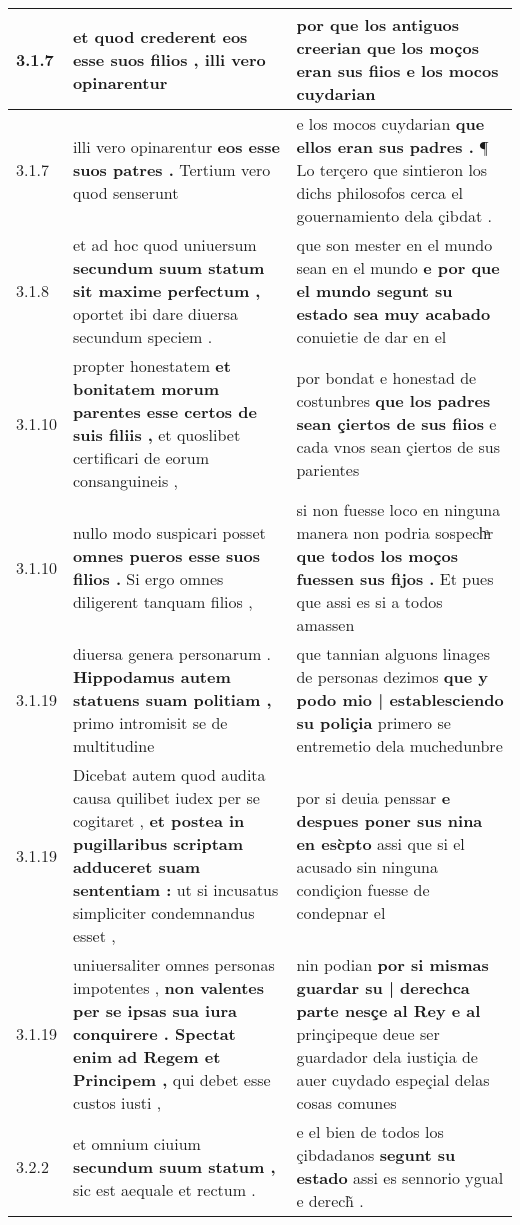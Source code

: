 \begin{tabular}{|p{1cm}|p{6.5cm}|p{6.5cm}|}
3.1.7 & et quod crederent \textbf{ eos esse suos filios , } illi vero opinarentur & por que los antiguos creerian \textbf{ que los moços eran sus fiios } e los mocos cuydarian \\\hline
3.1.7 & illi vero opinarentur \textbf{ eos esse suos patres . } Tertium vero quod senserunt & e los mocos cuydarian \textbf{ que ellos eran sus padres . } ¶ Lo terçero que sintieron los dichs philosofos cerca el gouernamiento dela çibdat . \\\hline
3.1.8 & et ad hoc quod uniuersum \textbf{ secundum suum statum sit maxime perfectum , } oportet ibi dare diuersa secundum speciem . & que son mester en el mundo sean en el mundo \textbf{ e por que el mundo segunt su estado sea muy acabado } conuietie de dar en el \\\hline
3.1.10 & propter honestatem \textbf{ et bonitatem morum parentes esse certos de suis filiis , } et quoslibet certificari de eorum consanguineis , & por bondat e honestad de costunbres \textbf{ que los padres sean çiertos de sus fiios } e cada vnos sean çiertos de sus parientes \\\hline
3.1.10 & nullo modo suspicari posset \textbf{ omnes pueros esse suos filios . } Si ergo omnes diligerent tanquam filios , & si non fuesse loco en ninguna manera non podria sospechͣr \textbf{ que todos los moços fuessen sus fijos . } Et pues que assi es si a todos amassen \\\hline
3.1.19 & diuersa genera personarum . \textbf{ Hippodamus autem statuens suam politiam , } primo intromisit se de multitudine & que tannian alguons linages de personas dezimos \textbf{ que y podo mio | establesciendo su poliçia } primero se entremetio dela muchedunbre \\\hline
3.1.19 & Dicebat autem quod audita causa quilibet iudex per se cogitaret , \textbf{ et postea in pugillaribus scriptam adduceret suam sententiam : } ut si incusatus simpliciter condemnandus esset , & por si deuia penssar \textbf{ e despues poner sus nina en esc̀pto } assi que si el acusado sin ninguna condiçion fuesse de condepnar el \\\hline
3.1.19 & uniuersaliter omnes personas impotentes , \textbf{ non valentes per se ipsas sua iura conquirere . Spectat enim ad Regem et Principem , } qui debet esse custos iusti , & nin podian \textbf{ por si mismas guardar su | derechca parte nesçe al Rey e al } prinçipeque deue ser guardador dela iustiçia de auer cuydado espeçial delas cosas comunes \\\hline
3.2.2 & et omnium ciuium \textbf{ secundum suum statum , } sic est aequale et rectum . & e el bien de todos los çibdadanos \textbf{ segunt su estado } assi es sennorio ygual e derech̃ . \\\hline

\end{tabular}

